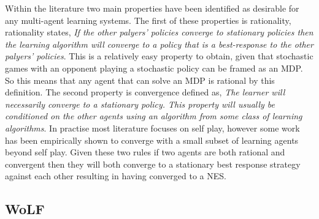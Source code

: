 \documentclass[conference]{IEEEtran}
\begin{document}
Within the literature two main properties have been identified as desirable for any multi-agent learning systems. The first of these properties is rationality\cite{bowling2002multiagent}, rationality states, \textit{If the other palyers' policies converge to stationary policies then the learning algorithm will converge to a policy that is a best-response to the other palyers' policies}. This is a relatively easy property to obtain, given that stochastic games with an opponent playing a stochastic policy can be framed as an MDP. So this means that any agent that can solve an MDP is rational by this definition\cite{bowling2002multiagent}. The second property is convergence defined as, \textit{The learner will necessarily converge to a stationary policy. This property will usually be conditioned on the other agents using an algorithm from some class of learning algorithms}. In practise most literature focuses on self play, however some work has been empirically shown to converge with a small subset of learning agents beyond self play\cite{bowling2002multiagent}. Given these two rules if two agents are both rational and convergent then they will both converge to a stationary best response strategy against each other resulting in having converged to a NES.


\subsection{WoLF}
\end{document}
